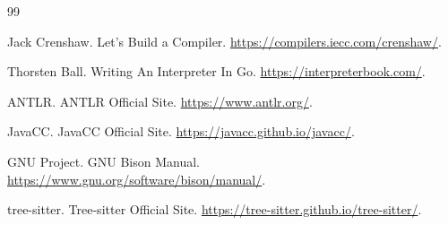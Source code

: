 \begin{thebibliography}{99}
    \item Jack Crenshaw. Let’s Build a Compiler. \url{https://compilers.iecc.com/crenshaw/}.
    \item Thorsten Ball. Writing An Interpreter In Go. \url{https://interpreterbook.com/}.
    \item ANTLR. ANTLR Official Site. \url{https://www.antlr.org/}.
    \item JavaCC. JavaCC Official Site. \url{https://javacc.github.io/javacc/}.
    \item GNU Project. GNU Bison Manual. \url{https://www.gnu.org/software/bison/manual/}.
    \item tree-sitter. Tree-sitter Official Site. \url{https://tree-sitter.github.io/tree-sitter/}.
\end{thebibliography}
